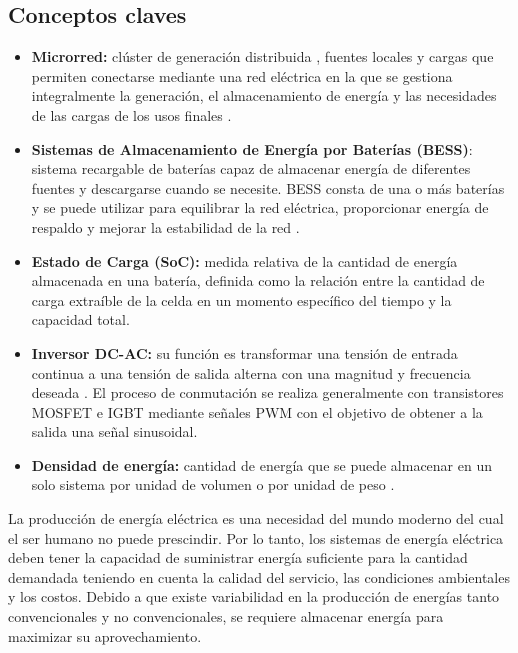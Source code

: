 \subsection{Conceptos claves}
\begin{itemize}
    \item \textbf{Microrred:} clúster de generación distribuida , fuentes locales y cargas que permiten conectarse mediante una red eléctrica en la que se gestiona integralmente la generación, el almacenamiento de energía y las necesidades de las cargas de los usos finales \cite{microgrid}.
    \item \textbf{Sistemas de Almacenamiento de Energía por Baterías (BESS)}: sistema recargable de baterías capaz de almacenar energía de diferentes fuentes y descargarse cuando se necesite. BESS consta de una o más baterías y se puede utilizar para equilibrar la red eléctrica, proporcionar energía de respaldo y mejorar la estabilidad de la red \cite{siemens}.
    \item  \textbf{Estado de Carga (SoC):} medida relativa de la cantidad de energía almacenada en una batería, definida como la relación entre la cantidad de carga extraíble de la celda en un momento específico del tiempo y la capacidad total.
    \item \textbf{Inversor DC-AC:} su función es transformar una tensión de entrada continua a una tensión de salida alterna con una magnitud y frecuencia deseada \cite{rashid-inversor}. El proceso de conmutación se realiza generalmente con transistores MOSFET e IGBT mediante señales PWM con el objetivo de obtener a la salida una señal sinusoidal.
    \item \textbf{Densidad de energía:} cantidad de energía que se puede almacenar en un solo sistema por unidad de volumen o por unidad de peso \cite{densidad}.
\end{itemize}

\newpage
La producción de energía eléctrica es una necesidad del mundo moderno del cual el ser humano no puede prescindir. Por lo tanto, los sistemas de energía eléctrica deben tener la capacidad de suministrar energía suficiente para la cantidad demandada teniendo en cuenta la calidad del servicio, las condiciones ambientales y los costos. Debido a que existe variabilidad en la producción de energías tanto  convencionales y no convencionales, se requiere almacenar energía para maximizar su aprovechamiento. 


